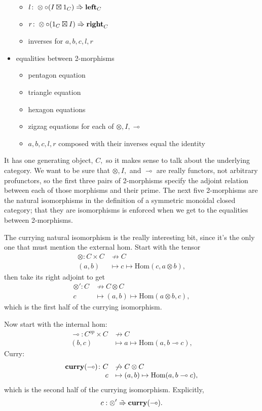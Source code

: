 \documentclass[12pt,twoside,openright]{report}
\newcommand{\maps}{\colon}
\newcommand{\lhom}{\multimap}
\newcommand{\tensor}{\otimes}
\newcommand{\mbold}[1]{\mbox{\bf #1}}
\newcommand{\isotoo}{\; \tilde{\Rightarrow} \;}
\newcommand{\Hom}{\mbox{Hom}}
\begin{document}
\begin{itemize}
\begin{itemize}
    \item $l\maps \tensor \circ (I \boxtimes 1_C) \isotoo \mbold{left}_C$
    \item $r\maps \tensor \circ (1_C \boxtimes I) \isotoo \mbold{right}_C$
    \item inverses for $a,b,c,l,r$
  \end{itemize}
  \item equalities between 2-morphisms
  \begin{itemize}
    \item pentagon equation
    \item triangle equation
    \item hexagon equations
    \item zigzag equations for each of $\tensor, I, \lhom$
    \item $a,b,c,l,r$ composed with their inverses equal the identity
  \end{itemize}
\end{itemize}

It has one generating object, $C,$ so it makes sense to talk about the underlying category.  We want to be sure that $\tensor, I,$ and $\lhom$ are really functors, not arbitrary profunctors, so the first three pairs of 2-morphisms specify the adjoint relation between each of those morphisms and their prime.  The next five 2-morphisms are the natural isomorphisms in the definition of a symmetric monoidal closed category; that they are isomorphisms is enforced when we get to the equalities between 2-morphisms.

The currying natural isomorphism is the really interesting bit, since it's the only one that must mention the external hom.  Start with the tensor
\[ \begin{array}{rl}\tensor\maps C \times C &\not\to C \\ (a,b) &\mapsto c \mapsto \Hom(c, a \tensor b),\end{array} \]
then take its right adjoint to get
\[ \begin{array}{rl}\tensor'\maps C & \not\to C \otimes C \\ c & \mapsto (a, b) \mapsto \Hom(a \tensor b, c),\end{array} \]
which is the first half of the currying isomorphism.

Now start with the internal hom:
\[ \begin{array}{rl}\lhom\maps C^{op} \times C &\not\to C \\ (b,c) &\mapsto a \mapsto \Hom(a, b \lhom c),\end{array} \]
Curry:
\[ \begin{array}{rl}\mbold{curry}(\lhom)\maps C &\not\to C \otimes C \\ c &\mapsto (a, b) \mapsto \Hom(a, b \lhom c),\end{array} \]
which is the second half of the currying isomorphism.  Explicitly,
\[ c:\tensor' \isotoo \mbold{curry}(\lhom). \]
\end{document}
